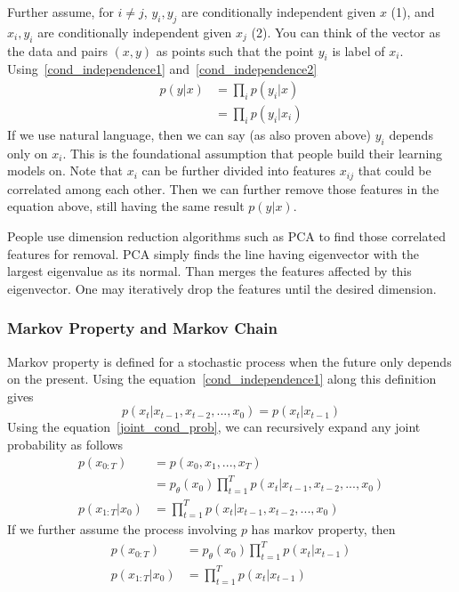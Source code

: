 \documentclass{article}
\numberwithin{equation}{subsection}
\begin{document}
Further assume, for $i \neq j$, $y_i, y_j$ are conditionally independent given $x$ (1), and $x_i, y_i$ are conditionally independent given $x_j$ (2). You can think of the vector as the data and pairs $(x,y)$ as points such that the point $y_i$ is label of $x_i$. Using~\ref{cond_independence1} and~\ref{cond_independence2}
\begin{align}
    p(y|x) &= \prod_i p(y_i|x)\\
           &= \prod_i p(y_i|x_i)
\end{align}
If we use natural language, then we can say (as also proven above) $y_i$ depends only on $x_i$. This is the foundational assumption that people build their learning models on. Note that $x_i$ can be further divided into features $x_{ij}$ that could be correlated among each other. Then we can further remove those features in the equation above, still having the same result $p(y|x)$. 

People use dimension reduction algorithms such as PCA to find those correlated features for removal. PCA simply finds the line having eigenvector with the largest eigenvalue as its normal. Than merges the features affected by this eigenvector. One may iteratively drop the features until the desired dimension.
\subsubsection{Markov Property and Markov Chain}
Markov property is defined for a stochastic process when the future only depends on the present. Using the equation~\ref{cond_independence1} along this definition gives
\begin{equation}
    p(x_t|x_{t-1},x_{t-2},...,x_0) = p(x_t|x_{t-1})
\end{equation}
Using the equation~\ref{joint_cond_prob}, we can recursively expand any joint probability as follows
\begin{align}
    p(x_{0:T}) &= p(x_0,x_1,...,x_T) \\
    &= p_\theta(x_0)\prod_{t=1}^T p(x_t|x_{t-1},x_{t-2},...,x_0)\\
    p(x_{1:T}|x_0) &= \prod_{t=1}^T p(x_t|x_{t-1},x_{t-2},...,x_0)
\end{align}
If we further assume the process involving $p$ has markov property, then
\begin{align}
    p(x_{0:T}) &= p_\theta(x_0)\prod_{t=1}^T p(x_t|x_{t-1}) \label{markov_chain_joint}\\
    p(x_{1:T}|x_0) &= \prod_{t=1}^T p(x_t|x_{t-1}) \label{markov_chain_cond}
\end{align}
\end{document}
